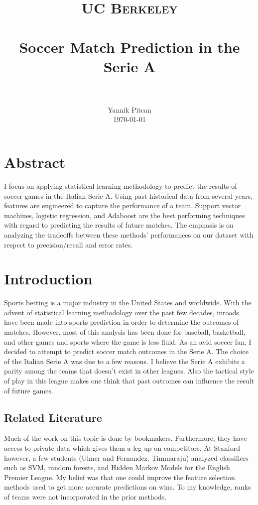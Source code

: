 \documentclass[paper=a4, fontsize=11pt]{scrartcl}
\title{
		\usefont{OT1}{bch}{b}{n}
		\normalfont \normalsize \textsc{UC Berkeley} \\ [25pt]
		\horrule{0.5pt} \\[0.4cm]
		\huge Soccer Match Prediction in the Serie A \\
		\horrule{2pt} \\[0.5cm]
}
\author{
		\normalfont 								\normalsize
        Yannik Pitcan\\[-3pt]		\normalsize
        \today
}
\date{}
\numberwithin{equation}{section}		%
\numberwithin{figure}{section}			%
\numberwithin{table}{section}				%
\begin{document}
\maketitle

\section{Abstract}
I focus on applying statistical learning methodology to predict the results of soccer games in the Italian Serie A. Using past historical data from several years, features are engineered to capture the performance of a team. Support vector machines, logistic regression, and Adaboost are the best performing techniques with regard to predicting the results of future matches. The emphasis is on analyzing the tradeoffs between these methods' performances on our dataset with respect to precision/recall and error rates.

\section{Introduction}
Sports betting is a major industry in the United States and worldwide. With the advent of statistical learning methodology over the past few decades, inroads have been made into sports prediction in order to determine the outcomes of matches. However, most of this analysis has been done for baseball, basketball, and other games and sports where the game is less fluid. As an avid soccer fan, I decided to attempt to predict soccer match outcomes in the Serie A. The choice of the Italian Serie A was due to a few reasons. I believe the Serie A exhibits a parity among the teams that doesn't exist in other leagues. Also the tactical style of play in this league makes one think that past outcomes can influence the result of future games.

\subsection{Related Literature}
Much of the work on this topic is done by bookmakers. Furthermore, they have access to private data which gives them a leg up on competitors. At Stanford however, a few students (Ulmer and Fernandez, Timmaraju) analyzed classifiers such as SVM, random forests, and Hidden Markov Models for the English Premier League. My belief was that one could improve the feature selection methods used to get more accurate predictions on wins. To my knowledge, ranks of teams were not incorporated in the prior methods.
\end{document}
